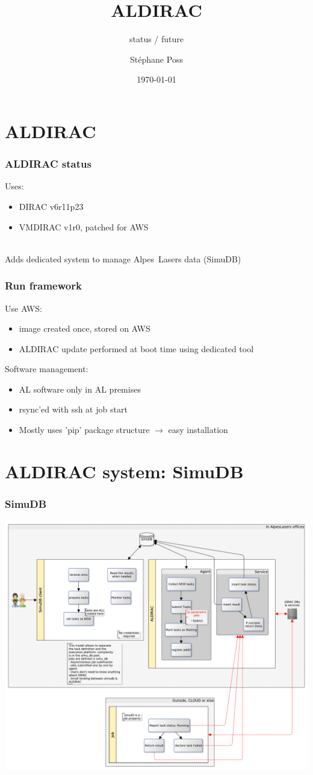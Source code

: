 \documentclass[14pt]{beamer}
\title{ALDIRAC}
\subtitle{status / future}
\author{St\'ephane Poss}
\date{\today}
\begin{document}
\begin{frame}[plain]
\titlepage
\end{frame}

\begin{frame}
\tableofcontents
\end{frame}

\section{ALDIRAC}
\begin{frame}
\frametitle{ALDIRAC status}
Uses:
\begin{itemize}
\item DIRAC v6r11p23
\pause
\item VMDIRAC v1r0, patched for AWS
\end{itemize}
~\\
\pause
Adds dedicated system to manage Alpes~Lasers data (SimuDB)
\end{frame}

\begin{frame}
\frametitle{Run framework}
Use AWS:
\begin{itemize}
\item image created once, stored on AWS
\item ALDIRAC update performed at boot time using dedicated tool
\end{itemize}
Software management:
\begin{itemize}
\item AL software only in AL premises
\item rsync'ed with ssh at job start
\item Mostly uses 'pip' package structure $\rightarrow$ easy installation
\end{itemize}
\end{frame}

\section{ALDIRAC system: SimuDB}
\begin{frame}
\frametitle{SimuDB}
\centering
\includegraphics[width=\textwidth]{Architecture1.pdf}
\end{frame}
\end{document}
